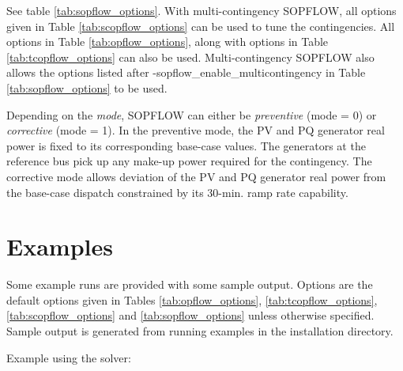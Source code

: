 See table \ref{tab:sopflow_options}. With multi-contingency SOPFLOW, all \scopflow options given in Table \ref{tab:scopflow_options} can be used to tune the contingencies. All \opflow options in Table \ref{tab:opflow_options}, along with \tcopflow options in Table \ref{tab:tcopflow_options} can also be used. Multi-contingency SOPFLOW also allows the options listed after -sopflow\_enable\_multicontingency in Table \ref{tab:sopflow_options} to be used.

Depending on the \emph{mode}, SOPFLOW can either be \emph{preventive} (mode = 0) or \emph{corrective} (mode = 1). In the preventive mode, the PV and PQ generator real power is fixed to its corresponding base-case values. The generators at the reference bus pick up any make-up power required for the contingency. The corrective mode allows deviation of the PV and PQ generator real power from the base-case dispatch constrained by its 30-min. ramp rate capability.

\section{Examples}
Some \sopflow example runs are provided with some sample output. Options are the default options given in Tables \ref{tab:opflow_options}, \ref{tab:tcopflow_options}, \ref{tab:scopflow_options} and \ref{tab:sopflow_options} unless otherwise specified. Sample output is generated from running examples in the installation directory.

Example using the \ipopt solver:

